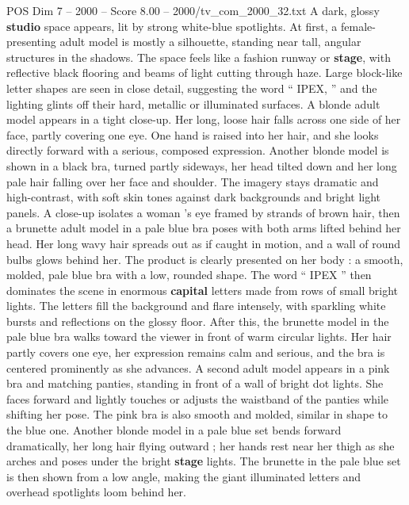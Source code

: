 \begin{textsample}{POS Dim 7 – 2000 – Score 8.00 – 2000/tv\_com\_2000\_32.txt}  \label{ex:f7_pos_073}
A dark, glossy \textbf{studio} space appears, lit by strong white-blue spotlights.
At first, a female-presenting adult model is mostly a silhouette, standing near tall, angular structures in the shadows.
The space feels like a fashion runway or \textbf{stage}, with reflective black flooring and beams of light cutting through haze.
Large block-like letter shapes are seen in close detail, suggesting the word “ IPEX, ” and the lighting glints off their hard, metallic or illuminated surfaces.
A blonde adult model appears in a tight close-up.
Her long, loose hair falls across one side of her face, partly covering one eye.
One hand is raised into her hair, and she looks directly forward with a serious, composed expression.
Another blonde model is shown in a black bra, turned partly sideways, her head tilted down and her long pale hair falling over her face and shoulder.
The imagery stays dramatic and high-contrast, with soft skin tones against dark backgrounds and bright light panels.
A close-up isolates a woman ’s eye framed by strands of brown hair, then a brunette adult model in a pale blue bra poses with both arms lifted behind her head.
Her long wavy hair spreads out as if caught in motion, and a wall of round bulbs glows behind her.
The product is clearly presented on her body : a smooth, molded, pale blue bra with a low, rounded shape.
The word “ IPEX ” then dominates the scene in enormous \textbf{capital} letters made from rows of small bright lights.
The letters fill the background and flare intensely, with sparkling white bursts and reflections on the glossy floor.
After this, the brunette model in the pale blue bra walks toward the viewer in front of warm circular lights.
Her hair partly covers one eye, her expression remains calm and serious, and the bra is centered prominently as she advances.
A second adult model appears in a pink bra and matching panties, standing in front of a wall of bright dot lights.
She faces forward and lightly touches or adjusts the waistband of the panties while shifting her pose.
The pink bra is also smooth and molded, similar in shape to the blue one.
Another blonde model in a pale blue set bends forward dramatically, her long hair flying outward ; her hands rest near her thigh as she arches and poses under the bright \textbf{stage} lights.
The brunette in the pale blue set is then shown from a low angle, making the giant illuminated letters and overhead spotlights loom behind her.

\end{textsample}
